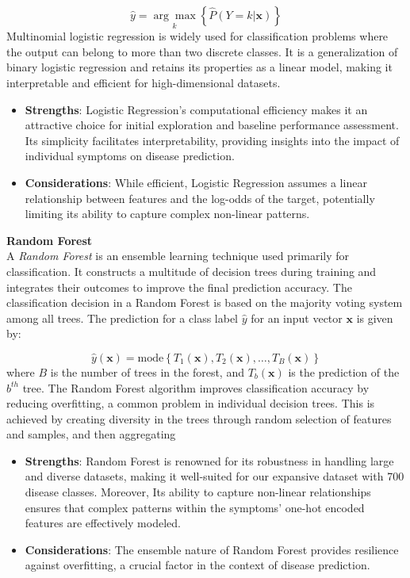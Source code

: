 \begin{equation}
	\hat{y} = \underset{k}{\arg\max} \left\{ \hat{P}(Y = k | \mathbf{x}) \right\}
\end{equation}
\noindent
Multinomial logistic regression is widely used for classification problems where the output can belong to more than two discrete classes. It is a generalization of binary logistic regression and retains its properties as a linear model, making it interpretable and efficient for high-dimensional datasets.

\begin{itemize}
	\item \textbf{Strengths}: Logistic Regression's computational efficiency makes it an attractive choice for initial exploration and
	      baseline performance assessment. Its simplicity facilitates interpretability, providing insights into the impact of individual symptoms on disease prediction.
	\item \textbf{Considerations}: While efficient, Logistic Regression assumes a linear relationship between features and the
	      log-odds of the target, potentially limiting its ability to capture complex non-linear patterns.
\end{itemize}
\vspace{0.3cm}

\noindent
\textbf{Random Forest}\vspace{0.15cm}\\
A \textit{Random Forest} is an ensemble learning technique used primarily for classification. It constructs a multitude of decision trees during training and integrates their outcomes to improve the final prediction accuracy. The classification decision in a Random Forest is based on the majority voting system among all trees.
The prediction for a class label $\hat{y}$ for an input vector $\mathbf{x}$ is given by:

\begin{equation}
	\hat{y}(\mathbf{x}) = \text{mode} \left\{ T_1(\mathbf{x}), T_2(\mathbf{x}), \ldots, T_B(\mathbf{x}) \right\}
\end{equation}
\noindent
where $B$ is the number of trees in the forest, and $T_b(\mathbf{x})$ is the prediction of the $b^{th}$ tree.
\noindent
The Random Forest algorithm improves classification accuracy by reducing overfitting, a common problem in individual decision trees. This is achieved by creating diversity in the trees through random selection of features and samples, and then aggregating

\begin{itemize}
	\item \textbf{Strengths}: Random Forest is renowned for its robustness in handling large and diverse datasets, making
	      it well-suited for our expansive dataset with 700 disease classes. Moreover, Its ability to capture non-linear relationships
	      ensures that complex patterns within the symptoms' one-hot encoded features are effectively modeled.
	\item \textbf{Considerations}: The ensemble nature of Random Forest provides resilience against overfitting, a crucial factor
	      in the context of disease prediction.
\end{itemize}

